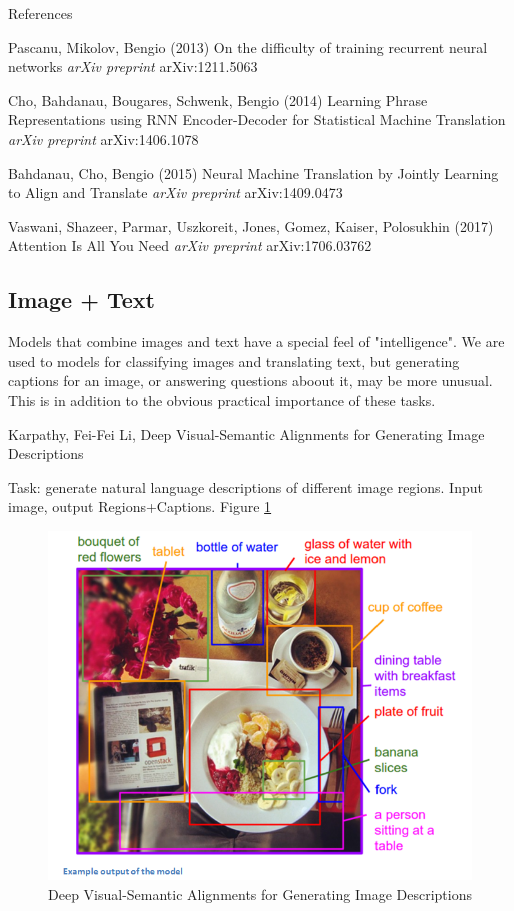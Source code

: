 \documentclass[english]{article}
\begin{document}
\item {References}

Pascanu, Mikolov, Bengio (2013) {On the difficulty of training recurrent neural networks}
 {\emph{arXiv preprint} arXiv:1211.5063}
 
Cho, Bahdanau, Bougares, Schwenk, Bengio (2014)
  {
  Learning Phrase Representations using RNN Encoder-Decoder for Statistical Machine Translation}
  {\emph{arXiv preprint} arXiv:1406.1078}
 
Bahdanau, Cho, Bengio (2015)
  {Neural Machine Translation by Jointly Learning to Align and Translate}
 {\emph{arXiv preprint} arXiv:1409.0473}
 
 Vaswani, Shazeer, Parmar, Uszkoreit, Jones, Gomez, Kaiser, Polosukhin (2017)
 {Attention Is All You Need}
 {\emph{arXiv preprint} arXiv:1706.03762}

\eenum

\subsection{Image + Text}


\benum
\item Models that combine images and text have a special feel of "intelligence". We are used to models for classifying images and translating text, but generating captions for an image, or answering questions aboout it, may be more unusual. This is in addition to the obvious practical importance of these tasks. 

\item 
Karpathy, Fei-Fei Li, Deep Visual-Semantic Alignments for Generating Image Descriptions
\benum 
\item Task: generate natural language descriptions of different image regions. Input image, output Regions+Captions. Figure \ref{Caption}

\begin{figure}
  \centering
  \includegraphics[scale=0.5]{Caption.png}
    \caption{Deep Visual-Semantic Alignments for Generating Image Descriptions}
    \label{Caption}
\end{figure}
\end{document}
